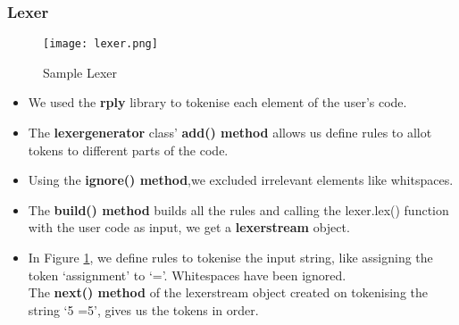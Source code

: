 \documentclass{article}
\begin{document}
\subsubsection{\large{Lexer}}
\begin{center}
\begin{figure}
\texttt{[image: lexer.png]}

\caption{Sample Lexer}
\label{fig:lexer}
\end{figure}
\end{center}
\begin{itemize}
\item We used the \textbf{rply} library to tokenise each element of the user's code.
\item The \textbf{lexergenerator} class'
\textbf{add() method} allows us define rules to allot tokens to different parts of the code.
\item Using the \textbf{ignore() method},we excluded irrelevant elements like whitspaces.
\item The \textbf{build() method} builds all the rules and calling the lexer.lex() function with the user code as input, we get a \textbf{lexerstream} object.
\item In Figure \ref{fig:lexer}, we define rules to tokenise the input string, like assigning the token `assignment' to `='. Whitespaces have been ignored. \\The \textbf{next() method} of the lexerstream object created on tokenising the string `5 =5', gives us the tokens in order. %
\end{itemize}
\end{document}
